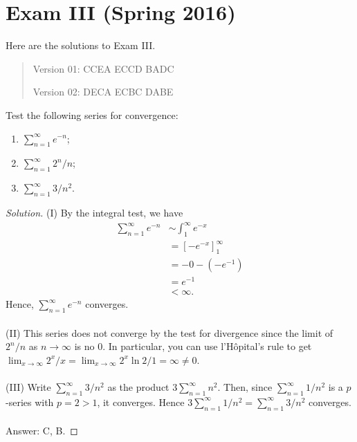\chapter{Exam III (Spring 2016)}
Here are the solutions to Exam III.
\begin{quote}
{\color{Green} Version 01}: CCEA ECCD BADC

{\color{Red} Version  02}: DECA ECBC DABE
\end{quote}

\begin{problem}
Test the following series for convergence:
\begin{enumerate}[label=(\MakeUppercase{\roman*})]
\item $\sum_{n=1}^\infty e^{-n}$;
\item $\sum_{n=1}^\infty2^n/n$;
\item $\sum_{n=1}^\infty3/n^2$.
\end{enumerate}
\end{problem}
\begin{proof}[Solution]
(I) By the integral test, we have
\begin{align*}
\sum_{n=1}^\infty e^{-n}
&\sim\int_1^\infty e^{-x}\\
&=\left[-e^{-x}\right]_1^\infty\\
&=-0-(-e^{-1})\\
&=e^{-1}\\
&<\infty.
\end{align*}
Hence, $\sum_{n=1}^\infty e^{-n}$ converges.
\\\\
(II) This series does not converge by the test for divergence since the
limit of $2^n/n$ as $n\to\infty$ is no $0$. In particular, you can use
l'Hôpital's rule to get $\lim_{x\to\infty}2^x/x=\lim_{x\to\infty}2^x\ln
2/1=\infty\neq 0$.
\\\\
(III) Write $\sum_{n=1}^\infty 3/n^2$ as the product $3\sum_{n=1}^\infty
n^2$. Then, since $\sum_{n=1}^\infty 1/n^2$ is a $p$-series with $p=2>1$,
it converges. Hence $3\sum_{n=1}^\infty 1/n^2=\sum_{n=1}^\infty 3/n^2$
converges.
\\\\
Answer: {\color{Green} C}, {\color{Red} B}.
\end{proof}

